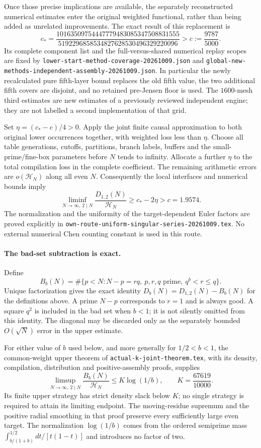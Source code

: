 Once those precise implications are available, the separately
reconstructed numerical estimates enter the original weighted
functional, rather than being added as unrelated improvements.
The exact result of this replacement is
\[
 c_*=
 \frac{10163509754447779483085347508831555}
      {5192296858534827628530496329220096}
 >c:=\frac{9787}{5000}.
\]
Its complete component list and the full-versus-shared numerical
replay scopes are fixed by
\texttt{lower-start-method-coverage-20261009.json} and
\texttt{global-new-methods-independent-assembly-20261009.json}.
In particular the newly recalculated pure fifth-layer bound
replaces the old fifth value, the two additional fifth covers are
disjoint, and no retained pre-Jensen floor is used.  The $1600$-mesh
third estimates are new estimates of a previously reviewed independent
engine; they are not labelled a second implementation of that grid.

Set $\eta=(c_*-c)/4>0$.  Apply the joint finite causal approximation
to both original lower occurrences together, with weighted loss
less than $\eta$.  Choose all table generations, cutoffs, partitions,
branch labels, buffers and the small-prime/fine-box parameters before
$N$ tends to infinity.  Allocate a further $\eta$ to the total
compilation loss in the complete coefficient.  The remaining
arithmetic errors are $o(\mathcal H_N)$ along all even $N$.
Consequently the local interfaces and numerical bounds imply
\[
 \liminf_{N\to\infty,\ 2\mid N}\frac{D_{1,2}(N)}{\mathcal H_N}
 \ge c_*-2\eta>c=1.9574.
\]
The normalization and the uniformity of the target-dependent Euler
factors are proved explicitly in
\texttt{own-route-uniform-singular-series-20261009.tex}.
No external numerical Chen counting constant is used in this route.

\paragraph{The bad-set subtraction is exact.}
Define
\[
 B_b(N)=\#\{p<N:N-p=rq,\ p,r,q\text{ prime},\ q^b<r\le q\}.
\]
Unique factorization gives the exact identity
$D_b(N)=D_{1,2}(N)-B_b(N)$ for the definitions above.  A prime
$N-p$ corresponds to $r=1$ and is always good.  A square $q^2$
is included in the bad set when $b<1$; it is not silently omitted
from this identity.  The diagonal may be discarded only as the
separately bounded $O(\sqrt N)$ error in the upper estimate.

For either value of $b$ used below, and more generally for
$1/2<b<1$, the common-weight upper theorem of
\texttt{actual-k-joint-theorem.tex}, with its density, compilation,
distribution and positive-assembly proofs, supplies
\[
 \limsup_{N\to\infty,\ 2\mid N}\frac{B_b(N)}{\mathcal H_N}
 \le K\log(1/b),\qquad K=\frac{67619}{10000}.
\]
Its finite upper strategy has strict density slack below $K$;
no single strategy is required to attain its limiting endpoint.
The moving-residue supremum and the positive radial smoothing in
that proof preserve every sufficiently large even target.  The
normalization $\log(1/b)$ comes from the ordered semiprime mass
$\int_{b/(1+b)}^{1/2}dt/[t(1-t)]$ and introduces no factor of two.

